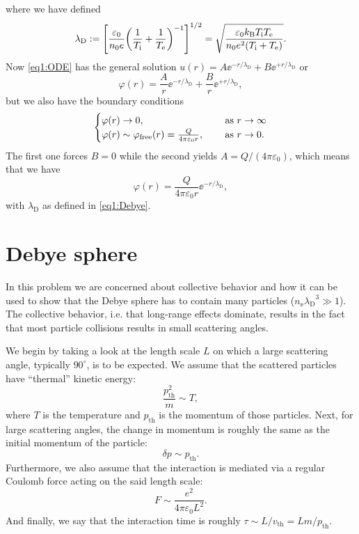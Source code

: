 \documentclass[11pt,a4paper, 
english, swedish %
]{article}
\newcommand{\lD}{\ensuremath{\lambda_{\text{D}}}}
\begin{document}
where we have defined
\begin{equation}\label{eq1:Debye}
\lD := \qty[\frac{\varepsilon_0}{n_0e}
\qty(\frac{1}{T_\ii}+\frac{1}{T_\ee})^{-1}]^{1/2}
=\sqrt{\frac{\varepsilon_0 k_\text{B}T_\ii T_\ee}
{n_0e^2(T_\ii + T_\ee)}}.
\end{equation}
Now \eqref{eq1:ODE} has the general solution
$u(r) = A\ee^{-r/\lD} + B\ee^{+r/\lD}$
or 
\begin{equation}
\varphi(r) = \frac{A}{r}\ee^{-r/\lD} + \frac{B}{r}\ee^{+r/\lD},
\end{equation}
but we also have the boundary conditions
\begin{equation}
\begin{cases}
\varphi(r)\to0\qc &\text{ as } r\to\infty\\
\varphi(r)\sim \varphi_{\text{free}}(r) 
= \frac{Q}{4\pi\varepsilon_0r} \qc&\text{ as } r\to0.
\end{cases}
\end{equation}
The first one forces $B=0$ while the second yields 
$A=Q/(4\pi\varepsilon_0)$, which means that we have 
\begin{equation}
\varphi(r)= \frac{Q}{4\pi\varepsilon_0r}\ee^{-r/\lD},
\end{equation}
with $\lD$ as defined in \eqref{eq1:Debye}.

\section{Debye sphere}
In this problem we are concerned about collective behavior and how it
can be used to show that the Debye sphere has to contain many
particles ($n_\ee\lD^3\gg1$). 
The collective behavior, i.e. that long-range effects dominate,
results in the fact that most particle collisions results in small
scattering angles.

We begin by taking a look at the length scale $L$ on which a large
scattering angle, typically $90^\circ$, is to be expected. We assume
that the scattered particles have ``thermal'' kinetic energy:
\begin{equation}
\frac{p_\text{th}^2}{m} \sim T,
\end{equation}
where $T$ is the temperature and $p_\text{th}$ is the momentum of
those particles. Next, for large scattering angles, the change
in momentum is roughly the same as the initial momentum of the
particle:
\begin{equation}
\delta p \sim p_\text{th}.
\end{equation}
Furthermore,  we also assume that the interaction is mediated via a
regular Coulomb force acting on the said length scale:
\begin{equation}
F\sim\frac{e^2}{4\pi\varepsilon_0L^2}.
\end{equation}
And finally, we say that the interaction time is roughly 
$\tau \sim L/v_\text{th} = Lm/p_\text{th}$. 
\end{document}

